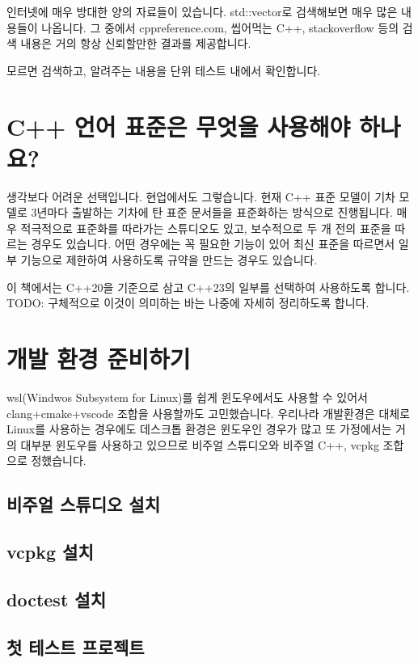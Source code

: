 인터넷에 매우 방대한 양의 자료들이 있습니다. std::vector로 검색해보면 매우 
많은 내용들이 나옵니다. 그 중에서 cppreference.com, 씹어먹는 C++, stackoverflow
등의 검색 내용은 거의 항상 신뢰할만한 결과를 제공합니다. 

모르면 검색하고, 알려주는 내용을 단위 테스트 내에서 확인합니다. 

\section{C++ 언어 표준은 무엇을 사용해야 하나요?}

생각보다 어려운 선택입니다. 현업에서도 그렇습니다. 현재 C++ 표준 모델이 기차 모델로 
3년마다 출발하는 기차에 탄 표준 문서들을 표준화하는 방식으로 진행됩니다. 매우 적극적으로 
표준화를 따라가는 스튜디오도 있고, 보수적으로 두 개 전의 표준을 따르는 경우도 있습니다. 
어떤 경우에는 꼭 필요한 기능이 있어 최신 표준을 따르면서 일부 기능으로 제한하여 
사용하도록 규약을 만드는 경우도 있습니다. 

이 책에서는 C++20을 기준으로 삼고 C++23의 일부를 선택하여 사용하도록 합니다. 
TODO: 구체적으로 이것이 의미하는 바는 나중에 자세히 정리하도록 합니다. 

\section{개발 환경 준비하기}

wsl(Windwos Subsystem for Linux)를 쉽게 윈도우에서도 사용할 수 있어서 clang+cmake+vscode
조합을 사용할까도 고민했습니다. 우리나라 개발환경은 대체로 Linux를 사용하는 경우에도 
데스크톱 환경은 윈도우인 경우가 많고 또 가정에서는 거의 대부분 윈도우를 사용하고 있으므로 
비주얼 스튜디오와 비주얼 C++, vcpkg 조합으로 정했습니다. 

\subsection{비주얼 스튜디오 설치}


\subsection{vcpkg 설치}


\subsection{doctest 설치}


\subsection{첫 테스트 프로젝트}






